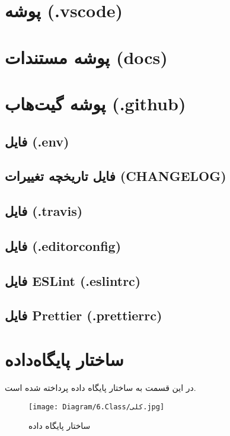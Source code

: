 \section{پوشه  (.vscode)}


\section{پوشه مستندات (docs)}


\section{پوشه گیت‌هاب (.github)}


\subsection{فایل  (.env)}


\subsection{فایل تاریخچه تغییرات (CHANGELOG)}


\subsection{فایل  (.travis)}


\subsection{فایل  (.editorconfig)}


\subsection{فایل ESLint (.eslintrc)}


\subsection{فایل Prettier (.prettierrc)}





\section{ساختار پایگاه‌داده}
در این قسمت به ساختار پایگاه داده پرداخته شده است.
\begin{figure}[H]
	\texttt{[image: Diagram/6.Class/کلی.jpg]}
	\centering
	\caption{ساختار پایگاه داده}
	\label{fig:db:پایگاه}
\end{figure}

